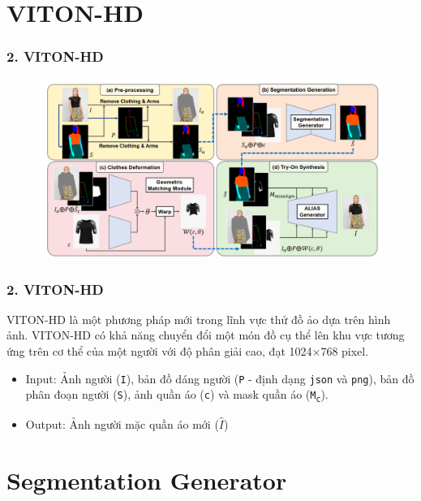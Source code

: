 \documentclass{beamer}
\begin{document}
\section{VITON-HD} 

\begin{frame}


\frametitle{2. VITON-HD}

\begin{figure}
    \centering
    \includegraphics[width=1\linewidth]{images/vitonhd.png}
    
\end{figure}

\end{frame}

\begin{frame}
\frametitle{2. VITON-HD}
VITON-HD là một phương pháp mới trong lĩnh vực thử đồ ảo dựa trên hình ảnh. 
VITON-HD có khả năng chuyển đổi một món đồ cụ thể lên khu vực tương ứng trên cơ thể của một người với độ phân giải cao, đạt 1024×768 pixel.
\begin{itemize}
    \item Input: Ảnh người (\texttt{I}), bản đồ dáng người (\texttt{P} - định dạng \texttt{json} và \texttt{png}), bản đồ phân đoạn người (\texttt{S}), ảnh quần áo (\texttt{c}) và mask quần áo (\texttt{M\textsubscript{c}}).
    \item Output: Ảnh người mặc quần áo mới (\texttt{$\hat{I}$})
\end{itemize}
\end{frame}



\section{Segmentation Generator} 
\end{document}
